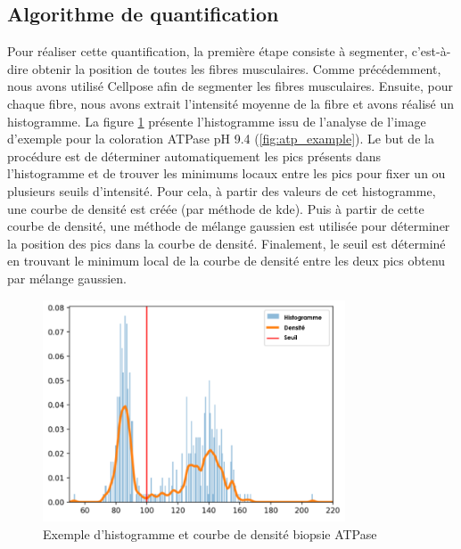 \subsection{Algorithme de quantification}
Pour réaliser cette quantification, la première étape consiste à segmenter, c'est-à-dire obtenir la position de toutes les fibres musculaires. Comme précédemment, nous avons utilisé Cellpose afin de segmenter les fibres musculaires. Ensuite, pour chaque fibre, nous avons extrait l'intensité moyenne de la fibre et avons réalisé un histogramme. La figure \ref{fig:atp_density} présente l'histogramme issu de l'analyse de l'image d'exemple pour la coloration ATPase pH 9.4 (\ref{fig:atp_example}). Le but de la procédure est de déterminer automatiquement les pics présents dans l'histogramme et de trouver les minimums locaux entre les pics pour fixer un ou plusieurs seuils d'intensité. Pour cela, à partir des valeurs de cet histogramme, une courbe de densité est créée (par méthode de \gls{kde}). Puis à partir de cette courbe de densité, une méthode de mélange gaussien est utilisée pour déterminer la position des pics dans la courbe de densité. Finalement, le seuil est déterminé en trouvant le minimum local de la courbe de densité entre les deux pics obtenu par mélange gaussien.
\begin{figure}[!ht]
 \centering
 \includegraphics[width=0.8\textwidth]{figures/density_plot.png}
 \caption[Exemple d'histogramme et courbe de densité biopsie ATPase]{Exemple d'histogramme et courbe de densité biopsie ATPase}
 \label{fig:atp_density}
\end{figure}

